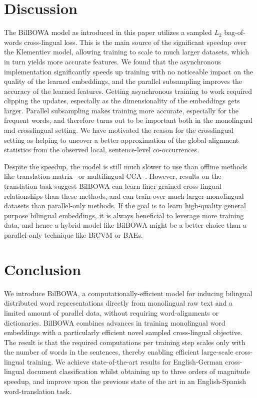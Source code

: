 \documentclass[10pt]{article}
\begin{document}
\section{Discussion}

The BilBOWA model as introduced in this paper utilizes a sampled $L_2$
bag-of-words cross-lingual loss. This is the main source of the significant
speedup over the Klementiev model, allowing training to scale to much larger
datasets, which in turn yields more accurate features.  We found that the
asynchronous implementation significantly speeds up training with no noticeable 
impact on the quality of the learned embeddings, and the parallel
subsampling improves the accuracy of the learned features.  Getting
asynchronous training to work required clipping the updates, especially as the
dimensionality of the embeddings gets larger. Parallel subsampling makes training 
more accurate, especially for the frequent
words, and therefore turns out to be important both in the monolingual and
crosslingual setting. We have motivated the reason for the crosslingual setting
as helping to uncover a better approximation of the global alignment statistics
from the observed local, sentence-level co-occurrences.

Despite the speedup, the model is still much slower to use than offline methods
like translation matrix~\cite{mikolov2013exploiting} or multilingual
CCA~\cite{faruqui2014improving}.  However, results on the translation task
suggest BilBOWA can learn finer-grained cross-lingual relationships than these
methods, and can train over much larger monolingual datasets than parallel-only
methods. If the goal is to learn high-quality general purpose bilingual
embeddings, it is always beneficial to leverage more training data, and
hence a hybrid model like BilBOWA might be a better choice than a parallel-only
technique like BiCVM or BAEs.

\section{Conclusion}
We introduce BilBOWA, a computationally-efficient model for inducing bilingual
distributed word representations directly from monolingual raw text and a limited
amount of parallel data, without requiring word-alignments or dictionaries.  
BilBOWA combines advances in training monolingual word embeddings with a
particularly efficient novel sampled cross-lingual objective.  The result is
that the required computations per training step scales only with the number of
words in the sentences, thereby enabling efficient large-scale cross-lingual
training.  We achieve state-of-the-art results for English-German cross-lingual
document classification whilst obtaining up to three orders of magnitude speedup, and 
improve upon the previous state of the art in an English-Spanish word-translation task.





\small


\end{document}

